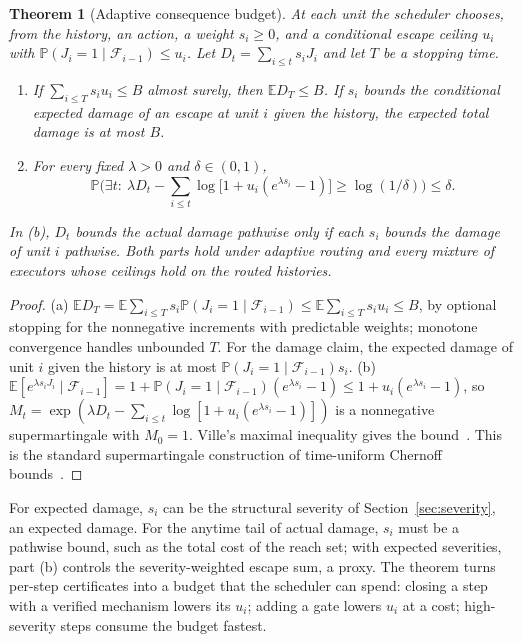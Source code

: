 \documentclass[11pt]{article}
\newtheorem{theorem}{Theorem}
\theoremstyle{definition}
\theoremstyle{remark}
\newcommand{\Prb}{\mathbb P}
\newcommand{\E}{\mathbb E}
\begin{document}
\begin{theorem}[Adaptive consequence budget]\label{thm:budget}
At each unit the scheduler chooses, from the history, an action, a weight $s_i\ge0$, and a
conditional escape ceiling $u_i$ with $\Prb(J_i=1\mid\mathcal F_{i-1})\le u_i$. Let
$D_t=\sum_{i\le t}s_iJ_i$ and let $T$ be a stopping time.
\begin{enumerate}[label=(\alph*),itemsep=2pt]
\item If $\sum_{i\le T}s_iu_i\le B$ almost surely, then $\E D_T\le B$. If $s_i$ bounds the conditional
expected damage of an escape at unit $i$ given the history, the expected total damage is at most $B$.
\item For every fixed $\lambda>0$ and $\delta\in(0,1)$,
\[
\Prb\Big(\exists t:\ \lambda D_t-\sum_{i\le t}\log\big[1+u_i(e^{\lambda s_i}-1)\big]\ge\log(1/\delta)\Big)\le\delta .
\]
\end{enumerate}
In (b), $D_t$ bounds the actual damage pathwise only if each $s_i$ bounds the damage of unit $i$
pathwise. Both parts hold under adaptive routing and every mixture of executors whose ceilings hold on
the routed histories.
\end{theorem}
\begin{proof}
(a) $\E D_T=\E\sum_{i\le T}s_i\Prb(J_i=1\mid\mathcal F_{i-1})\le\E\sum_{i\le T}s_iu_i\le B$, by
optional stopping for the nonnegative increments with predictable weights; monotone convergence
handles unbounded $T$. For the damage claim, the expected damage of unit $i$ given the history is
at most $\Prb(J_i=1\mid\mathcal F_{i-1})s_i$. (b) $\E[e^{\lambda s_iJ_i}\mid\mathcal F_{i-1}]=1+\Prb(J_i=1\mid\mathcal
F_{i-1})(e^{\lambda s_i}-1)\le1+u_i(e^{\lambda s_i}-1)$, so
$M_t=\exp(\lambda D_t-\sum_{i\le t}\log[1+u_i(e^{\lambda s_i}-1)])$ is a nonnegative supermartingale
with $M_0=1$. Ville's maximal inequality gives the bound~\cite{ville}. This is the standard
supermartingale construction of time-uniform Chernoff bounds~\cite{howard20}.
\end{proof}
For expected damage, $s_i$ can be the structural severity of Section~\ref{sec:severity}, an expected
damage. For the anytime tail of actual damage, $s_i$ must be a pathwise bound, such as the total cost of
the reach set; with expected severities, part (b) controls the severity-weighted escape sum, a proxy. The theorem turns per-step certificates into a budget that the
scheduler can spend: closing a step with a verified mechanism lowers its $u_i$; adding a gate lowers
$u_i$ at a cost; high-severity steps consume the budget fastest.
\end{document}
